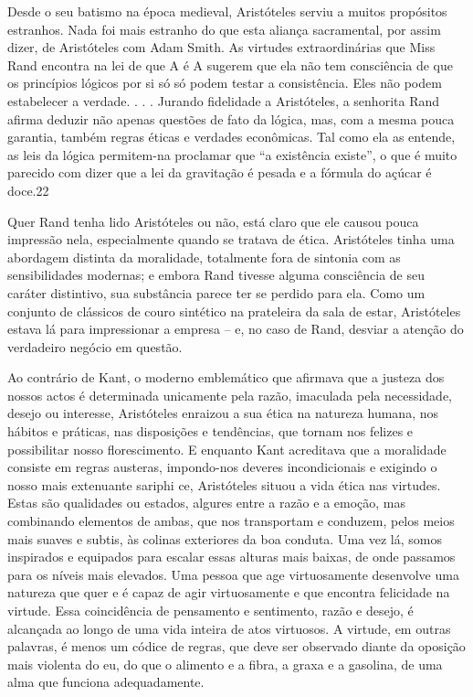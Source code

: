  \par 
Desde o seu batismo na época medieval, Aristóteles serviu a muitos propósitos estranhos. Nada foi mais estranho do que esta aliança sacramental, por assim dizer, de Aristóteles com Adam Smith. As virtudes extraordinárias que Miss Rand encontra na lei de que A é A sugerem que ela não tem consciência de que os princípios lógicos por si só só podem testar a consistência. Eles não podem estabelecer a verdade. . . . Jurando fidelidade a Aristóteles, a senhorita Rand afirma deduzir não apenas questões de fato da lógica, mas, com a mesma pouca garantia, também regras éticas e verdades econômicas. Tal como ela as entende, as leis da lógica permitem-na proclamar que “a existência existe”, o que é muito parecido com dizer que a lei da gravitação é pesada e a fórmula do açúcar é doce.{\color{blue}22}
 \par 
Quer Rand tenha lido Aristóteles ou não, está claro que ele causou pouca impressão nela, especialmente quando se tratava de ética. Aristóteles tinha uma abordagem distinta da moralidade, totalmente fora de sintonia com as sensibilidades modernas; e embora Rand tivesse alguma consciência de seu caráter distintivo, sua substância parece ter se perdido para ela. Como um conjunto de clássicos de couro sintético na prateleira da sala de estar, Aristóteles estava lá para impressionar a empresa – e, no caso de Rand, desviar a atenção do verdadeiro negócio em questão.
 \par 
Ao contrário de Kant, o moderno emblemático que afirmava que a justeza dos nossos actos é determinada unicamente pela razão, imaculada pela necessidade, desejo ou interesse, Aristóteles enraizou a sua ética na natureza humana, nos hábitos e práticas, nas disposições e tendências, que tornam nos felizes e possibilitar nosso florescimento. E enquanto Kant acreditava que a moralidade consiste em regras austeras, impondo-nos deveres incondicionais e exigindo o nosso mais extenuante sariphi ce, Aristóteles situou a vida ética nas virtudes. Estas são qualidades ou estados, algures entre a razão e a emoção, mas combinando elementos de ambas, que nos transportam e conduzem, pelos meios mais suaves e subtis, às colinas exteriores da boa conduta. Uma vez lá, somos inspirados e equipados para escalar essas alturas mais baixas, de onde passamos para os níveis mais elevados. Uma pessoa que age virtuosamente desenvolve uma natureza que quer e é capaz de agir virtuosamente e que encontra felicidade na virtude. Essa coincidência de pensamento e sentimento, razão e desejo, é alcançada ao longo de uma vida inteira de atos virtuosos. A virtude, em outras palavras, é menos um códice de regras, que deve ser observado diante da oposição mais violenta do eu, do que o alimento e a fibra, a graxa e a gasolina, de uma alma que funciona adequadamente.
